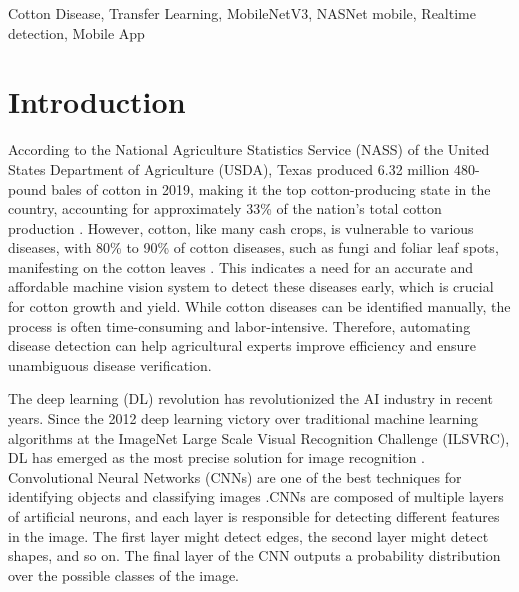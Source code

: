 \documentclass[conference]{IEEEtran}
\begin{document}
\begin{IEEEkeywords}
 Cotton Disease, Transfer Learning, MobileNetV3, NASNet mobile, Realtime detection, Mobile App
\end{IEEEkeywords}

\section{Introduction}
According to the National Agriculture Statistics Service (NASS) of the United States Department of Agriculture (USDA), Texas produced 6.32 million 480-pound bales of cotton in 2019, making it the top cotton-producing state in the country, accounting for approximately 33\% of the nation's total cotton production \cite{ USDA-NASS}. However, cotton, like many cash crops, is vulnerable to various diseases, with 80\% to 90\% of cotton diseases, such as fungi and foliar leaf spots, manifesting on the cotton leaves  \cite{Gulhane-Gurjar}.  This indicates a need for an accurate and affordable machine vision system to detect these diseases early, which is crucial for cotton growth and yield. While cotton diseases can be identified manually, the process is often time-consuming and labor-intensive. Therefore, automating disease detection can help agricultural experts improve efficiency and ensure unambiguous disease verification.

\par The deep learning (DL) revolution has revolutionized the AI industry in recent years. Since the 2012 deep learning victory over traditional machine learning algorithms at the ImageNet Large Scale Visual Recognition Challenge (ILSVRC), DL has emerged as the most precise solution for image recognition  \cite{Ashqar-Naser}\cite{Gehlot-Saini}. Convolutional Neural Networks (CNNs) are one of the best techniques for identifying objects and classifying images \cite{Sarangdhar-Pawar}.CNNs are composed of multiple layers of artificial neurons, and each layer is responsible for detecting different features in the image. The first layer might detect edges, the second layer might detect shapes, and so on. The final layer of the CNN outputs a probability distribution over the possible classes of the image.
\end{document}
